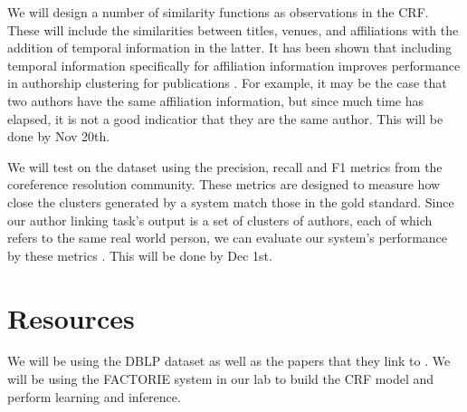 \documentclass[]{article}
\begin{document}
We will design a number of similarity functions as observations in the CRF. These will include the similarities between titles, venues, and affiliations with the addition of temporal information in the latter. It has been shown that including temporal information specifically for affiliation information improves performance in authorship clustering for publications \cite{DBLP:journals/fcsc/LiDMS12}. For example, it may be the case that two authors have the same affiliation information, but since much time has elapsed, it is not a good indicatior that they are the same author.
This will be done by Nov 20th.

We will test on the dataset using the precision, recall and F1 metrics from the coreference resolution community.  These metrics are designed to measure how close the clusters generated by a system match those in the gold standard.  Since our author linking task's output is a set of clusters of authors, each of which refers to the same real world person, we can evaluate our system's performance by these metrics \cite{Bagga98algorithms, Vilain95}.
This will be done by Dec 1st.

\section{Resources} %
\label{sec:resources}
We will be using the DBLP dataset as well as the papers that they link to \cite{ley2002dblp}. We will be using the FACTORIE system in our lab \cite{mccallum2009factorie} to build the CRF model and perform learning and inference.



\end{document}
